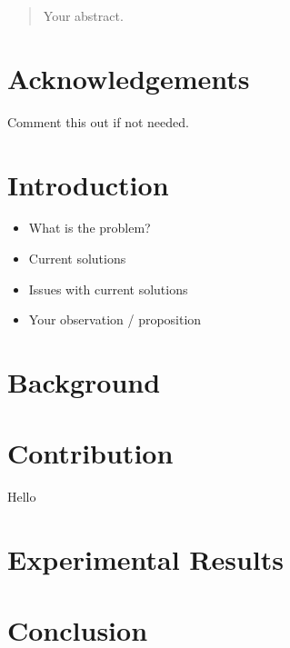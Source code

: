 \documentclass[12pt]{article}
\date{September 2019}
\begin{document}



\clearpage{\pagestyle{empty}\cleardoublepage}
\setcounter{page}{1}
\pagestyle{fancy}

\begin{abstract}
Your abstract.

\end{abstract}

\cleardoublepage
\section*{Acknowledgements}
Comment this out if not needed.

\clearpage{\pagestyle{empty}\cleardoublepage}

\tableofcontents 


\clearpage{\pagestyle{empty}\cleardoublepage}
\setcounter{page}{1}
\fancyhead[LE,RO]{\slshape \rightmark}
\fancyhead[LO,RE]{\slshape \leftmark}

\section{Introduction}

\begin{itemize}

    \item What is the problem?
    \item Current solutions
    \item Issues with current solutions
    \item Your observation / proposition

\end{itemize}

\newpage
\section{Background}



\newpage
\section{Contribution}
Hello \cite{Cudeiro2019}


\newpage
\section{Experimental Results}


\newpage
\section{Conclusion}


\newpage


\end{document}
